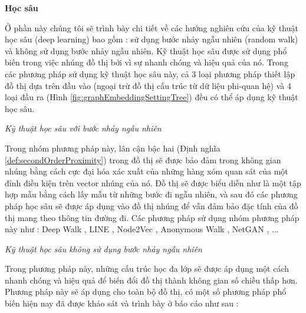 \textbf{Học sâu}

Ở phần này chúng tôi sẽ trình bày chi tiết về các hướng nghiên cứu của kỹ thuật học sâu (deep learning) bao gồm : sử dụng bước nhảy ngẫu nhiên (random walk) và không sử dụng bước nhảy ngẫu nhiên. Kỹ thuật học sâu được sử dụng phổ biến trong việc nhúng đồ thị bởi vì sự nhanh chóng và hiệu quả của nó. Trong các phương pháp sử dụng kỹ thuật học sâu này, cả 3 loại phương pháp thiết lập đồ thị dựa trên đầu vào (ngoại trừ đồ thị cấu trúc từ dữ liệu phi-quan hệ) và 4 loại đầu ra (Hình \ref{fig:graphEmbeddingSettingTree}) đều có thể áp dụng kỹ thuật học sâu. 

\textit{Kỹ thuật học sâu với bước nhảy ngẫu nhiên}

Trong nhóm phương pháp này, lân cận bậc hai (Định nghĩa \ref{def:secondOrderProximity}) trong đồ thị sẽ được bảo đảm trong không gian nhúng bằng cách cực đại hóa xác xuất của những hàng xóm quan sát của một đỉnh điều kiện trên vector nhúng của nó. Đồ thị sẽ được biểu diễn như là một tập hợp mẫu bằng cách lấy mẫu từ những bước đi ngẫu nhiên, và sau đó các phương pháp học sâu sẽ được áp dụng vào đồ thị nhúng để vẫn đảm bảo đặc tính của đồ thị mang theo thông tin đường đi. Các phương pháp sử dụng nhóm phương pháp này như : Deep Walk \cite{perozzi2014deepwalk}, LINE \cite{tang2015line}, Node2Vec \cite{grover2016node2vec}, Anonymous Walk \cite{ivanov2018anonymous}, NetGAN \cite{bojchevski2018netgan}, ...

\textit{Kỹ thuật học sâu không sử dụng bước nhảy ngẫu nhiên}

Trong phương pháp này, những cấu trúc học đa lớp sẽ được áp dụng một cách nhanh chóng và hiệu quả để biến đổi đồ thị thành không gian số chiều thấp hơn. Phương pháp này sẽ áp dụng cho toàn bộ đồ thị, có một số phương pháp phổ biến hiện nay đã được khảo sát và trình bày ở báo cáo \cite{rossi2020knowledge} như sau :

